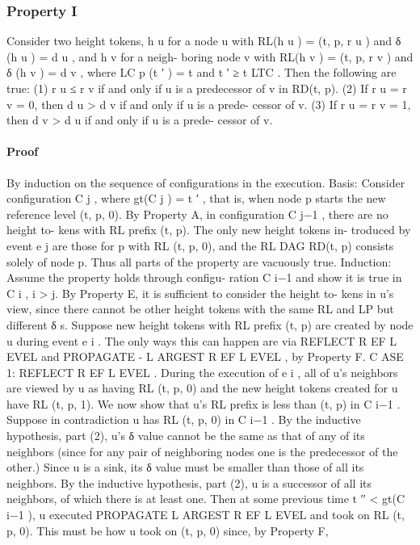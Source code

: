 \documentclass{article}
\begin{document}
\subsubsection{Property I}
Consider two height tokens, h u for a node u
with RL(h u ) = (t, p, r u ) and δ (h u ) = d u , and h v for a neigh-
boring node v with RL(h v ) = (t, p, r v ) and δ (h v ) = d v , where
LC p (t ′ ) = t and t ′ ≥ t LTC . Then the following are true:
(1) r u ≤ r v if and only if u is a predecessor of v in RD(t, p).
(2) If r u = r v = 0, then d u > d v if and only if u is a prede-
cessor of v.
(3) If r u = r v = 1, then d v > d u if and only if u is a prede-
cessor of v.

\paragraph{Proof}
By induction on the sequence of configurations in
the execution.
Basis: Consider configuration C j , where gt(C j ) = t ′ , that
is, when node p starts the new reference level (t, p, 0). By
Property A, in configuration C j−1 , there are no height to-
kens with RL prefix (t, p). The only new height tokens in-
troduced by event e j are those for p with RL (t, p, 0), and
the RL DAG RD(t, p) consists solely of node p. Thus all
parts of the property are vacuously true.
Induction: Assume the property holds through configu-
ration C i−1 and show it is true in C i , i > j.
By Property E, it is sufficient to consider the height to-
kens in u’s view, since there cannot be other height tokens
with the same RL and LP but different δ s.
Suppose new height tokens with RL prefix (t, p) are
created by node u during event e i . The only ways this
can happen are via REFLECT R EF L EVEL and PROPAGATE -
L ARGEST R EF L EVEL , by Property F.
C ASE 1: REFLECT R EF L EVEL . During the execution of
e i , all of u’s neighbors are viewed by u as having RL (t, p, 0)
and the new height tokens created for u have RL (t, p, 1).
We now show that u’s RL prefix is less than (t, p) in
C i−1 . Suppose in contradiction u has RL (t, p, 0) in C i−1 .
By the inductive hypothesis, part (2), u’s δ value cannot be
the same as that of any of its neighbors (since for any pair
of neighboring nodes one is the predecessor of the other.)
Since u is a sink, its δ value must be smaller than those of
all its neighbors. By the inductive hypothesis, part (2), u is a
successor of all its neighbors, of which there is at least one.
Then at some previous time t ′′ < gt(C i−1 ), u executed
PROPAGATE L ARGEST R EF L EVEL and took on RL (t, p, 0).
This must be how u took on (t, p, 0) since, by Property F,
\end{document}
